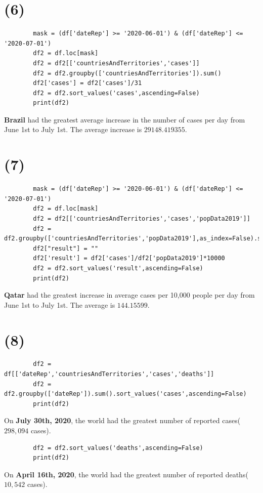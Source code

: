 \documentclass[12pt]{article}
\begin{document}
    \section*{(6)}
    \begin{lstlisting}
        mask = (df['dateRep'] >= '2020-06-01') & (df['dateRep'] <= '2020-07-01')
        df2 = df.loc[mask]
        df2 = df2[['countriesAndTerritories','cases']]
        df2 = df2.groupby(['countriesAndTerritories']).sum()
        df2['cases'] = df2['cases']/31
        df2 = df2.sort_values('cases',ascending=False)
        print(df2)
    \end{lstlisting}
    \textbf{Brazil} had the greatest average increase in the number of cases per day from June 1st to July 1st. The average increase is $29148.419355$.

    \section*{(7)}
    \begin{lstlisting}
        mask = (df['dateRep'] >= '2020-06-01') & (df['dateRep'] <= '2020-07-01')
        df2 = df.loc[mask]
        df2 = df2[['countriesAndTerritories','cases','popData2019']]
        df2 = df2.groupby(['countriesAndTerritories','popData2019'],as_index=False).sum()
        df2["result"] = ""
        df2['result'] = df2['cases']/df2['popData2019']*10000
        df2 = df2.sort_values('result',ascending=False)
        print(df2)
    \end{lstlisting}
    \textbf{Qatar} had the greatest increase in average cases per 10,000 people per day from June 1st to July 1st. The average is $144.15599$.

    \section*{(8)}
    \begin{lstlisting}
        df2 = df[['dateRep','countriesAndTerritories','cases','deaths']]
        df2 = df2.groupby(['dateRep']).sum().sort_values('cases',ascending=False)
        print(df2)
    \end{lstlisting}
    On \textbf{July 30th, 2020}, the world had the greatest number of reported cases($298,094$ cases).
    \begin{lstlisting}
        df2 = df2.sort_values('deaths',ascending=False)
        print(df2)
    \end{lstlisting}
    On \textbf{April 16th, 2020}, the world had the greatest number of reported deaths($10,542$ cases).
\end{document}
